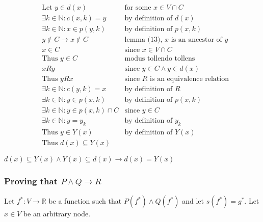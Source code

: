 \documentclass[11pt]{article}
\begin{document}
\begin{align*}
& \text{Let $y \in d(x)$} & \text{for some $x \in V \cap C$} \\
& \text{$\exists k \in \mathbb{N}: c(x,k)=y$} & \text{by definition of $d(x)$} \\
& \text{$\exists k \in \mathbb{N}: x\in p(y,k)$} & \text{by definition of $p(x,k)$} \\
& \text{$y \not \in C \rightarrow x \not \in C$} & \text{lemma (13), $x$ is an ancestor of $y$} \\
& \text{$x \in C$} & \text{since $x \in V \cap C$} \\
& \text{Thus $y\in C$} & \text{modus tollendo tollens} \\
& \text{$xRy$} & \text{since $y \in C \land y \in d(x)$} \\
& \text{Thus $yRx$} & \text{since $R$ is an equivalence relation} \\
& \text{$\exists k \in \mathbb{N}: c(y,k)=x$} & \text{by definition of $R$} \\
& \text{$\exists k \in \mathbb{N}: y\in p(x,k)$} & \text{by definition of $p(x,k)$} \\
& \text{$\exists k \in \mathbb{N}: y\in p(x,k) \cap C$} & \text{since $y \in C$} \\
& \text{$\exists k \in \mathbb{N}: y = y_{k}$} & \text{by definition of $y_{k}$} \\
& \text{Thus $y \in Y(x)$} & \text{by definition of $Y(x)$} \\
& \text{Thus $d(x) \subseteq Y(x)$} & \text{}
\end{align*}

$d(x) \subseteq Y(x) \land Y(x) \subseteq d(x) \rightarrow d(x)=Y(x)$

\subsubsection{Proving that $P\land Q\rightarrow R$}

Let $f^{*}: V \rightarrow \mathbb{R}$ be a function such that $P(f^{*})\land Q(f^{*})$ and let $s(f^{*}) = g^{*}$. Let $x\in V$ be an arbitrary node.
\end{document}
